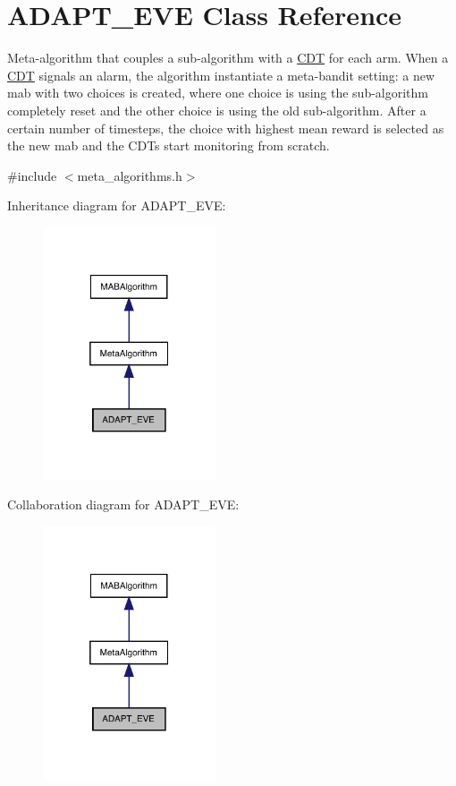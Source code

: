 \hypertarget{class_a_d_a_p_t___e_v_e}{}\section{A\+D\+A\+P\+T\+\_\+\+E\+VE Class Reference}
\label{class_a_d_a_p_t___e_v_e}


Meta-\/algorithm that couples a sub-\/algorithm with a \mbox{\hyperlink{class_c_d_t}{C\+DT}} for each arm. When a \mbox{\hyperlink{class_c_d_t}{C\+DT}} signals an alarm, the algorithm instantiate a meta-\/bandit setting\+: a new mab with two choices is created, where one choice is using the sub-\/algorithm completely reset and the other choice is using the old sub-\/algorithm. After a certain number of timesteps, the choice with highest mean reward is selected as the new mab and the C\+D\+Ts start monitoring from scratch.  




{\ttfamily \#include $<$meta\+\_\+algorithms.\+h$>$}



Inheritance diagram for A\+D\+A\+P\+T\+\_\+\+E\+VE\+:
\nopagebreak
\begin{figure}[H]
\begin{center}
\leavevmode
\includegraphics[width=145pt]{class_a_d_a_p_t___e_v_e__inherit__graph}
\end{center}
\end{figure}


Collaboration diagram for A\+D\+A\+P\+T\+\_\+\+E\+VE\+:
\nopagebreak
\begin{figure}[H]
\begin{center}
\leavevmode
\includegraphics[width=145pt]{class_a_d_a_p_t___e_v_e__coll__graph}
\end{center}
\end{figure}
